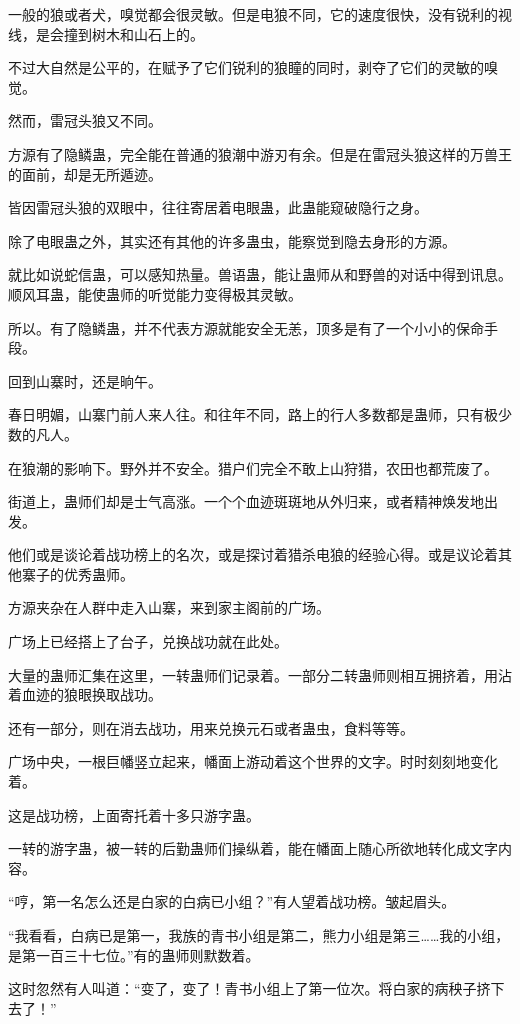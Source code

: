 \begin{this_body}
一般的狼或者犬，嗅觉都会很灵敏。但是电狼不同，它的速度很快，没有锐利的视线，是会撞到树木和山石上的。

不过大自然是公平的，在赋予了它们锐利的狼瞳的同时，剥夺了它们的灵敏的嗅觉。

然而，雷冠头狼又不同。

方源有了隐鳞蛊，完全能在普通的狼潮中游刃有余。但是在雷冠头狼这样的万兽王的面前，却是无所遁迹。

皆因雷冠头狼的双眼中，往往寄居着电眼蛊，此蛊能窥破隐行之身。

除了电眼蛊之外，其实还有其他的许多蛊虫，能察觉到隐去身形的方源。

就比如说蛇信蛊，可以感知热量。兽语蛊，能让蛊师从和野兽的对话中得到讯息。顺风耳蛊，能使蛊师的听觉能力变得极其灵敏。

所以。有了隐鳞蛊，并不代表方源就能安全无恙，顶多是有了一个小小的保命手段。

回到山寨时，还是晌午。

春日明媚，山寨门前人来人往。和往年不同，路上的行人多数都是蛊师，只有极少数的凡人。

在狼潮的影响下。野外并不安全。猎户们完全不敢上山狩猎，农田也都荒废了。

街道上，蛊师们却是士气高涨。一个个血迹斑斑地从外归来，或者精神焕发地出发。

他们或是谈论着战功榜上的名次，或是探讨着猎杀电狼的经验心得。或是议论着其他寨子的优秀蛊师。

方源夹杂在人群中走入山寨，来到家主阁前的广场。

广场上已经搭上了台子，兑换战功就在此处。

大量的蛊师汇集在这里，一转蛊师们记录着。一部分二转蛊师则相互拥挤着，用沾着血迹的狼眼换取战功。

还有一部分，则在消去战功，用来兑换元石或者蛊虫，食料等等。

广场中央，一根巨幡竖立起来，幡面上游动着这个世界的文字。时时刻刻地变化着。

这是战功榜，上面寄托着十多只游字蛊。

一转的游字蛊，被一转的后勤蛊师们操纵着，能在幡面上随心所欲地转化成文字内容。

“哼，第一名怎么还是白家的白病已小组？”有人望着战功榜。皱起眉头。

“我看看，白病已是第一，我族的青书小组是第二，熊力小组是第三……我的小组，是第一百三十七位。”有的蛊师则默数着。

这时忽然有人叫道：“变了，变了！青书小组上了第一位次。将白家的病秧子挤下去了！”


\end{this_body}
